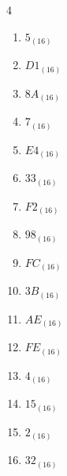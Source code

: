 \begin{multicols}{4}
\begin{enumerate}
  \item $5_{(16)}$

        \phantom{$=5$}

  \item $D1_{(16)}$

        \phantom{$=209$}

  \item $8A_{(16)}$

        \phantom{$=138$}

  \item $7_{(16)}$

        \phantom{$=7$}

  \item $E4_{(16)}$

        \phantom{$=228$}

  \item $33_{(16)}$

        \phantom{$=51$}

  \item $F2_{(16)}$

        \phantom{$=242$}

  \item $98_{(16)}$

        \phantom{$=152$}

  \item $FC_{(16)}$

        \phantom{$=252$}

  \item $3B_{(16)}$

        \phantom{$=59$}

\columnbreak %

  \item $AE_{(16)}$

        \phantom{$=174$}

  \item $FE_{(16)}$

        \phantom{$=254$}

  \item $4_{(16)}$

        \phantom{$=4$}

  \item $15_{(16)}$

        \phantom{$=21$}

  \item $2_{(16)}$

        \phantom{$=2$}

  \item $32_{(16)}$


\end{enumerate}
\end{multicols}
